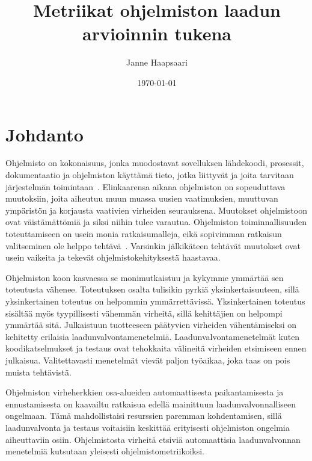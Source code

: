 \documentclass[finnish]{tktltiki2}
\title{Metriikat ohjelmiston laadun arvioinnin tukena}
\author{Janne Haapsaari}
\date{\today}
\theoremstyle{definition}
\theoremstyle{remark}
\begin{document}

\frontmatter      %

\maketitle        %
\makeabstract     %

\tableofcontents  %


\mainmatter       %
\onehalfspacing

\section{Johdanto}

Ohjelmisto on kokonaisuus, jonka muodostavat sovelluksen lähdekoodi, prosessit, dokumentaatio ja ohjelmiston käyttämä tieto, jotka liittyvät ja joita tarvitaan järjestelmän toimintaan~\cite{IEEE90, ISO9000}. Elinkaarensa aikana ohjelmiston on sopeuduttava muutoksiin, joita aiheutuu muun muassa uusien vaatimuksien, muuttuvan ympäristön ja korjausta vaativien virheiden seurauksena. Muutokset ohjelmistoon ovat väistämättömiä ja siksi niihin tulee varautua. Ohjelmiston toiminnallisuuden toteuttamiseen on usein monia ratkaisumalleja, eikä sopivimman ratkaisun valitseminen ole helppo tehtävä~\cite{CK94}. Varsinkin jälkikäteen tehtävät muutokset ovat usein vaikeita ja tekevät ohjelmistokehityksestä haastavaa.

Ohjelmiston koon kasvaessa se monimutkaistuu ja kykymme ymmärtää sen toteutusta vähenee. Toteutuksen osalta tulisikin pyrkiä yksinkertaisuuteen, sillä yksinkertainen toteutus on helpommin ymmärrettävissä. Yksinkertainen toteutus sisältää myös tyypillisesti vähemmän virheitä, sillä kehittäjien on helpompi ymmärtää sitä. Julkaistuun tuotteeseen päätyvien virheiden vähentämiseksi on kehitetty erilaisia laadunvalvontamenetelmiä. Laadunvalvontamenetelmät kuten koodikatselmukset ja testaus ovat tehokkaita välineitä virheiden etsimiseen ennen julkaisua. Valitettavasti menetelmät vievät paljon työaikaa, joka taas on pois muista tehtävistä.

Ohjelmiston virheherkkien osa-alueiden automaattisesta paikantamisesta ja ennustamisesta on kaavailtu ratkaisua edellä mainittuun laadunvalvonnalliseen ongelmaan. Tämä mahdollistaisi resurssien paremman kohdentamisen, sillä laadunvalvonta ja testaus voitaisiin keskittää erityisesti ohjelmiston ongelmia aiheuttaviin osiin. Ohjelmistosta virheitä etsiviä automaattisia laadunvalvonnan menetelmiä kutsutaan yleisesti ohjelmistometriikoiksi.
\end{document}
